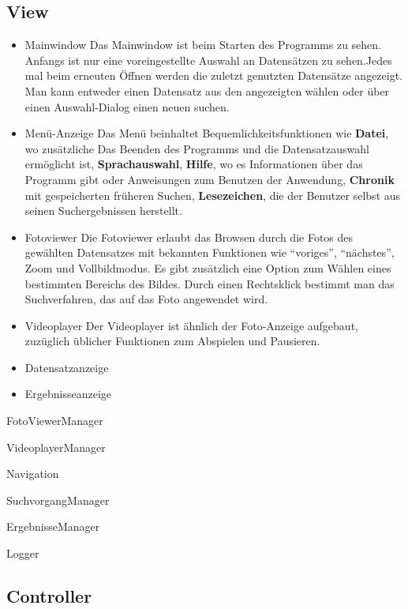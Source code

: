 \subsection{View}
\begin{itemize}
\item Mainwindow \newline
Das Mainwindow ist beim Starten des Programms zu sehen. Anfangs ist nur eine voreingestellte Auswahl an Datensätzen zu sehen.Jedes mal beim erneuten Öffnen werden die zuletzt genutzten Datensätze angezeigt. Man kann entweder einen Datensatz aus den angezeigten wählen oder über einen Auswahl-Dialog einen neuen suchen.
\item Menü-Anzeige \newline
Das Menü beinhaltet Bequemlichkeitsfunktionen wie \textbf{Datei}, wo zusätzliche Das Beenden des Programms und die Datensatzauswahl ermöglicht ist, \textbf{Sprachauswahl}, \textbf{Hilfe}, wo es Informationen über das Programm gibt oder Anweisungen zum Benutzen der Anwendung, \textbf{Chronik} mit gespeicherten früheren Suchen, \textbf{Lesezeichen}, die der Benutzer selbst aus seinen Suchergebnissen herstellt.
\item Fotoviewer \newline
Die Fotoviewer erlaubt das Browsen durch die Fotos des gewählten Datensatzes mit bekannten Funktionen wie \enquote{voriges}, \enquote{nächstes}, Zoom und Vollbildmodus. Es gibt zusätzlich eine Option zum Wählen eines bestimmten Bereichs des Bildes. Durch einen Rechtsklick bestimmt man das Suchverfahren, das auf das Foto angewendet wird.
\item Videoplayer \newline
Der Videoplayer ist ähnlich der Foto-Anzeige aufgebaut, zuzüglich üblicher Funktionen zum Abspielen und Pausieren.
\item Datensatzanzeige \newline

\item Ergebnisseanzeige \newline


\end{itemize}
\item FotoViewerManager \newline
\item VideoplayerManager \newline
\item Navigation \newline
\item SuchvorgangManager \newline
\item ErgebnisseManager \newline
\item Logger \newline


\subsection{Controller}
\begin{itemize}

\end{itemize}

\pagebreak

